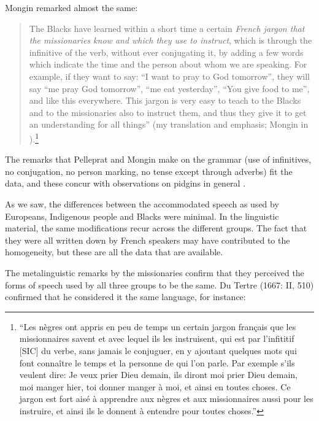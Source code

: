 \documentclass[output=paper,colorlinks,citecolor=brown]{langscibook}
\begin{document}
Mongin remarked almost the same: 
\begin{quote}
The Blacks have learned within a short time a certain \textit{French jargon that the missionaries know and which they use to instruct}, which is through the infinitive of the verb, without ever conjugating it, by adding a few words which indicate the time and the person about whom we are speaking. For example, if they want to say: “I want to pray to God tomorrow”, they will say “me pray God tomorrow”, “me eat yesterday”, “You give food to me”, and like this everywhere. This jargon is very easy to teach to the Blacks and to the missionaries also to instruct them, and thus they give it to get an understanding for all things” (my translation and emphasis; Mongin in \citealt[134--135]{Chatillon1984}).\footnote{“Les nègres ont appris en peu de temps un certain jargon français que les missionnaires savent et avec lequel ils les instruisent, qui est par l'infititif [SIC] du verbe, sans jamais le conjuguer, en y ajoutant quelques mots qui font connaître le temps et la personne de qui l'on parle. Par exemple s'ils veulent dire: Je veux prier Dieu demain, ils diront moi prier Dieu demain, moi manger hier, toi donner manger à moi, et ainsi en toutes choses. Ce jargon est fort aisé à apprendre aux nègres et aux missionnaires aussi pour les instruire, et ainsi ils le donnent à entendre pour toutes choses.”}

\end{quote}


The remarks that Pelleprat and Mongin make on the grammar (use of infinitives, no conjugation, no person marking, no tense except through adverbs) fit the data, and these concur with observations on pidgins in general \citep{Parkvall2017,Parkvall2020}.

As we saw, the differences between the accommodated speech as used by Europeans, Indigenous people and Blacks were minimal. In the linguistic material, the same modifications recur across the different groups. The fact that they were all written down by French speakers may have contributed to the homogeneity, but these are all the data that are available. 

The metalinguistic remarks by the missionaries confirm that they perceived the forms of speech used by all three groups to be the same. Du Tertre (1667: II, 510) confirmed that he considered it the same language, for instance:
\end{document}
